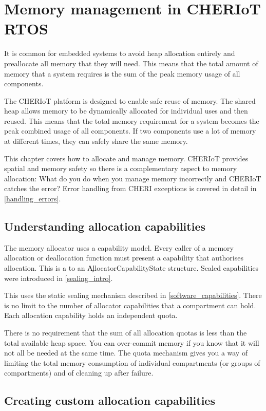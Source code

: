 \chapter[label=shared_heap]{Memory management in CHERIoT RTOS}

It is common for embedded systems to avoid heap allocation entirely and preallocate all memory that they will need.
This means that the total amount of memory that a system requires is the sum of the peak memory usage of all components.

The CHERIoT platform is designed to enable safe reuse of memory.
The shared heap allows memory to be dynamically allocated for individual uses and then reused.
This means that the total memory requirement for a system becomes the peak combined usage of all components.
If two components use a lot of memory at different times, they can safely share the same memory.

This chapter covers how to allocate and manage memory.
CHERIoT provides spatial and memory safety so there is a complementary aspect to memory allocation: What do you do when you manage memory incorrectly and CHERIoT catches the error?
Error handling from CHERI exceptions is covered in detail in \ref{handling_errors}.

\section{Understanding allocation capabilities}

The memory allocator uses a capability model.
Every caller of a memory allocation or deallocation function must present a capability that authorises allocation.
This is a  to an \c{AllocatorCapabilityState} structure.
Sealed capabilities were introduced in \ref{sealing_intro}.

This uses the static sealing mechanism described in \ref{software_capabilities}.
There is no limit to the number of allocator capabilities that a compartment can hold.
Each allocation capability holds an independent quota.

There is no requirement that the sum of all allocation quotas is less than the total available heap space.
You can over-commit memory if you know that it will not all be needed at the same time.
The quota mechanism gives you a way of limiting the total memory consumption of individual compartments (or groups of compartments) and of cleaning up after failure.

\section[label=custom_alloc_capabilities]{Creating custom allocation capabilities}

